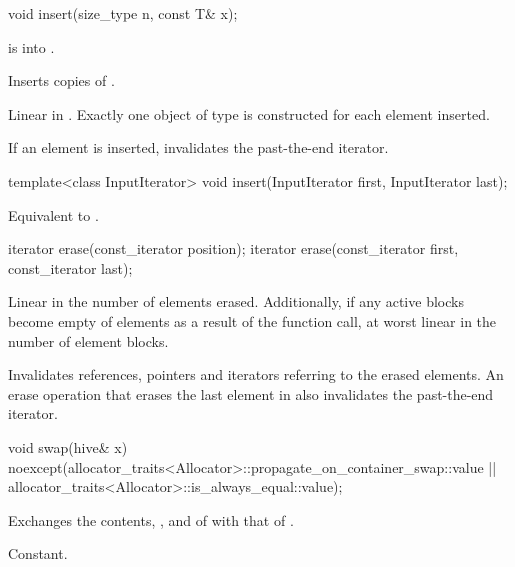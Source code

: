 %
\begin{itemdecl}
void insert(size_type n, const T& x);
\end{itemdecl}

\begin{itemdescr}
\pnum
\expects
{} is  into .

\pnum
\effects
Inserts  copies of .

\pnum
\complexity
Linear in .
Exactly one object of type  is constructed for each element inserted.

\pnum
\remarks
If an element is inserted, invalidates the past-the-end iterator.
\end{itemdescr}

%
\begin{itemdecl}
template<class InputIterator>
  void insert(InputIterator first, InputIterator last);
\end{itemdecl}

\begin{itemdescr}
\pnum
\effects
Equivalent to .
\end{itemdescr}

%
\begin{itemdecl}
iterator erase(const_iterator position);
iterator erase(const_iterator first, const_iterator last);
\end{itemdecl}

\begin{itemdescr}
\pnum
\complexity
Linear in the number of elements erased.
Additionally, if any active blocks become empty of elements
as a result of the function call,
at worst linear in the number of element blocks.

\pnum
\remarks
Invalidates references, pointers and iterators
referring to the erased elements.
An erase operation that erases the last element in 
also invalidates the past-the-end iterator.
\end{itemdescr}

%
\begin{itemdecl}
void swap(hive& x)
  noexcept(allocator_traits<Allocator>::propagate_on_container_swap::value ||
           allocator_traits<Allocator>::is_always_equal::value);
\end{itemdecl}

\begin{itemdescr}
\pnum
\effects
Exchanges the contents, , and 
of  with that of .

\pnum
\complexity
Constant.
\end{itemdescr}

